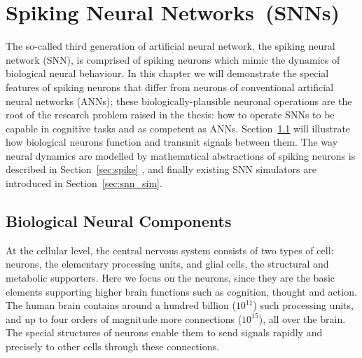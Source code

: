 \chapter{Spiking Neural Networks~(SNNs)}
\label{cha:bkg}
The so-called third generation of artificial neural network, the spiking neural network (SNN), is comprised of spiking neurons which mimic the dynamics of biological neural behaviour.
In this chapter we will demonstrate the special features of spiking neurons that differ from neurons of conventional artificial neural networks (ANNs);
these biologically-plausible neuronal operations are the root of the research problem raised in the thesis: how to operate SNNs to be capable in cognitive tasks and as competent as ANNs.
Section~\ref{sec:bio_neuron} will illustrate how biological neurons function and transmit signals between them.
The way neural dynamics are modelled by mathematical abstractions of spiking neurons is described in Section~\ref{sec:spike} , and finally existing SNN simulators are introduced in Section~\ref{sec:snn_sim}.

\section{Biological Neural Components}
\label{sec:bio_neuron}
At the cellular level, the central nervous system consists of two types of cell: neurons, the elementary processing units, and glial cells, the structural and metabolic supporters. 
Here we focus on the neurons, since they are the basic elements supporting higher brain functions such as cognition, thought and action. %
The human brain contains around a hundred billion ($10^{11}$) such processing units, and up to four orders of magnitude more connections ($10^{15}$), all over the brain.
The special structures of neurons enable them to send signals rapidly and precisely to other cells through these connections.
